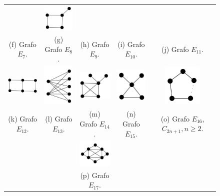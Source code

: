 \begin{figure}[htb]
\begin{tabular}{  c c c c  c}
    & 
    \includegraphics[width=1.8cm]{img/e11.png} 
    \\ %
    \footnotesize 
    (f)  \footnotesize Grafo $E_7$. 
    & 
    \footnotesize (g) Grafo $E_8$.
    & 
    \footnotesize (h) Grafo $E_9$.
    & 
    \footnotesize (i) Grafo $E_{10}$.
    & 
    \footnotesize (j) Grafo $E_{11}$.
    \\%
        \includegraphics[width=2.5cm]{img/e12.png} 
    & 
    \includegraphics[width=2cm]{img/k25.png} 
    & 
    \includegraphics[width=2cm]{img/e14.png} 
    & 
    \includegraphics[width=1.8cm]{img/e15.png} 
    & 
    \includegraphics[width=1.8cm]{img/c2n+1.png} 
    \\ %
    \footnotesize 
    (k)  \footnotesize Grafo $E_{12}$. 
    & 
    \footnotesize (l) Grafo $E_{13}$.
    & 
    \footnotesize (m) Grafo  $E_{14}$.
    & 
    \footnotesize (n) Grafo $E_{15}$.
    & 
    \footnotesize (o)  Grafo $E_{16}$,  $C_{2n+1},n\geq2$.
    \\
    &&\includegraphics[width=2.5cm]{img/4sunNoLabel.png}&&
    \\
    &&\footnotesize (p)  Grafo $E_{17}$.&&
    

\end{tabular}
\end{figure}
